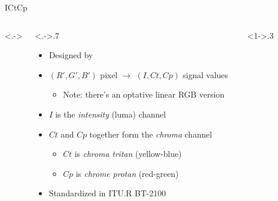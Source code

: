 \documentclass[aspectratio=169,handout,usepdftitle=false]{fireshonks}
\begin{document}
\begin{frame}{ICtCp}
    \begin{columns}<.->
        \begin{column}<.->{.7\textwidth}
            \begin{itemize}
                \item Designed by \textcite{ictcp}
                \item $(R', G', B')$ pixel $\rightarrow$ $(I, Ct, Cp)$ signal values
                      \begin{itemize}
                          \item Note: there's an optative linear RGB version
                      \end{itemize}
                \item $I$ is the \emph{intensity} (luma) channel
                \item $Ct$ and $Cp$ together form the \emph{chroma} channel
                      \begin{itemize}
                          \item $Ct$ is \emph{chroma tritan} (yellow-blue)
                          \item $Cp$ is \emph{chrome protan} (red-green)
                      \end{itemize}
                \item Standardized in ITU.R BT-2100 \parencite*{BT2100}
            \end{itemize}
        \end{column}
        \begin{column}<1->{.3\textwidth}
            \begin{figure}

\end{figure}
\end{column}
\end{columns}
\end{frame}
\end{document}
